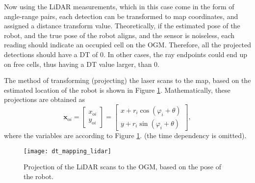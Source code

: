 Now using the LiDAR measurements, which in this case come in the form of angle-range pairs,
each detection can be transformed to map coordinates, and assigned a distance transform value.
Theoretically, if the estimated pose of the robot, and the true pose of the robot aligns,
and the sensor is noiseless, each reading should indicate an occupied cell on the OGM.
Therefore, all the projected detections should have a DT of 0.
In other cases, the ray endpoints could end up on free cells, thus having a DT value larger,
than 0.

The method of transforming (projecting) the laser scans to the map, based on the estimated
location of the robot is shown in Figure \ref{fig:ogm-laser-projection}.
Mathematically, these projections are obtained as
\begin{equation}
    \mathbf{x}_{\mathrm{o}i} = \begin{bmatrix}x_{\mathrm{o}i}\\y_{\mathrm{o}i}\end{bmatrix}
    = \begin{bmatrix}x + r_i\cos(\varphi_i + \theta)\\y + r_i\sin(\varphi_i + \theta)\end{bmatrix},
\end{equation}
where the variables are according to Figure \ref{fig:ogm-laser-projection}. (the time dependency is omitted).
\begin{figure}[htbp]
    \centering
    \texttt{[image: dt\_mapping\_lidar]}
    \caption{Projection of the LiDAR scans to the OGM, based on the pose of the robot.}
    \label{fig:ogm-laser-projection}
\end{figure}

